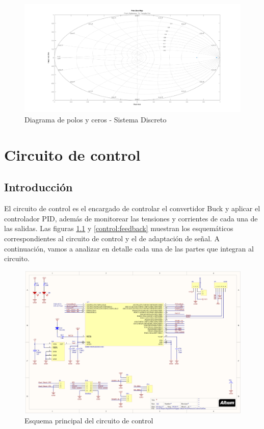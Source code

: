 \documentclass[12pt]{report}
\begin{document}
	\begin{figure}
		\centering
		\includegraphics[width=\textwidth,height=\textheight,keepaspectratio]{buck_polos_ceros_discrete}
		\caption{Diagrama de polos y ceros - Sistema Discreto}
		\label{buck:polos_ceros_discrete}
	\end{figure}
	
\chapter{Circuito de control}

\section{Introducción}

El circuito de control es el encargado de controlar el convertidor Buck y aplicar el controlador PID, además de monitorear las tensiones y corrientes de cada una de las salidas. Las figuras \ref{control:main} y \ref{control:feedback} muestran los esquemáticos correspondientes al circuito de control y el de adaptación de señal. A continuación, vamos a analizar en detalle cada una de las partes que integran al circuito.

\begin{figure}
	\centering
	\includegraphics[width=\textwidth,height=\textheight,keepaspectratio]{sch_control_main} 
	\caption{Esquema principal del circuito de control}
	\label{control:main}
\end{figure}
\end{document}

